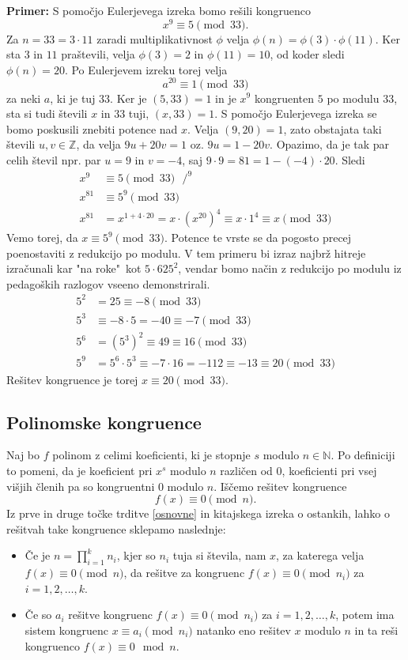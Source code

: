 \documentclass[12pt, a4paper]{article}
\newenvironment{prim}[1][]{\par\medskip\noindent \textbf{Primer: }}{\medskip}
\begin{document}
\begin{prim}
S pomočjo Eulerjevega izreka bomo rešili kongruenco
$$x^{9}\equiv 5 \pmod{33}.$$
Za $n=33=3\cdot 11$ zaradi multiplikativnost $\phi$ velja $\phi(n)=\phi(3)\cdot\phi(11)$. Ker sta $3$ in $11$ praštevili, velja $\phi(3)=2$ in $\phi(11)=10$, od koder sledi $\phi(n)=20$. Po Eulerjevem izreku torej velja $$a^{20}\equiv 1\pmod{33}$$ za neki $a$, ki je tuj $33$. Ker je $(5,33)=1$ in je $x^{9}$ kongruenten $5$ po modulu 33, sta si tudi števili $x$ in $33$ tuji, $(x,33)=1$. S pomočjo Eulerjevega izreka se bomo poskusili znebiti potence nad $x$. Velja $(9,20)=1$, zato obstajata taki števili $u,v\in\mathbb{Z}$, da velja $9u+20v=1$ oz. $9u=1-20v$. Opazimo, da je tak par celih števil npr. par $u=9$ in $v=-4$, saj $9\cdot 9=81=1-(-4)\cdot 20$. Sledi
\begin{align*}
x^{9}&\equiv 5\pmod{33} \ \ \ / ^{9} \\
x^{81}&\equiv 5^{9} \pmod{33} \\
x^{81}&= x^{1+4\cdot 20} = x\cdot(x^{20})^{4}\equiv x\cdot 1^{4} \equiv x\pmod{33}
\end{align*}
Vemo torej, da $x\equiv 5^{9} \pmod{33}$. Potence te vrste se da pogosto precej poenostaviti z redukcijo po modulu. V tem primeru bi izraz najbrž hitreje izračunali kar "na roke"\ kot $5\cdot 625^{2}$, vendar bomo način z redukcijo po modulu iz pedagoških razlogov vseeno demonstrirali.
\begin{align*}
5^{2}&=25\equiv -8\pmod{33} \\
5^{3}&\equiv -8\cdot 5 = -40\equiv -7\pmod{33} \\
5^{6}&=(5^{3})^{2}\equiv 49\equiv 16\pmod{33} \\
5^{9}&=5^{6}\cdot 5^{3}\equiv -7\cdot 16 =-112\equiv -13\equiv 20\pmod{33}
\end{align*}
Rešitev kongruence je torej $x\equiv 20\pmod{33}$.
\end{prim}

\subsection{Polinomske kongruence}

Naj bo $f$ polinom z celimi koeficienti, ki je stopnje $s$ modulo $n\in \mathbb{N}$. Po definiciji to pomeni, da je koeficient pri $x^{s}$ modulo $n$ različen od $0$, koeficienti pri vsej višjih členih pa so kongruentni $0$ modulo $n$. Iščemo rešitev kongruence
$$f(x)\equiv 0\pmod n.$$
Iz prve in druge točke trditve \ref{osnovne} in kitajskega izreka o ostankih, lahko o rešitvah take kongruence sklepamo naslednje:
\begin{itemize}
\item Če je $n=\prod_{i=1}^{k}n_{i}$, kjer so $n_{i}$ tuja si števila, nam $x$, za katerega velja $f(x)\equiv 0 \pmod n$, da rešitve za kongruenc $f(x)\equiv 0 \pmod{n_{i}}$ za $i=1,2,\dots,k$.
\item Če so $a_{i}$ rešitve kongruenc $f(x)\equiv 0 \pmod{n_{i}}$ za $i=1,2,\dots,k$, potem ima sistem kongruenc $x\equiv a_{i}\pmod{n_{i}}$ natanko eno rešitev $x$ modulo $n$ in ta reši kongruenco $f(x)\equiv 0\mod n$.
\end{itemize}
\end{document}
